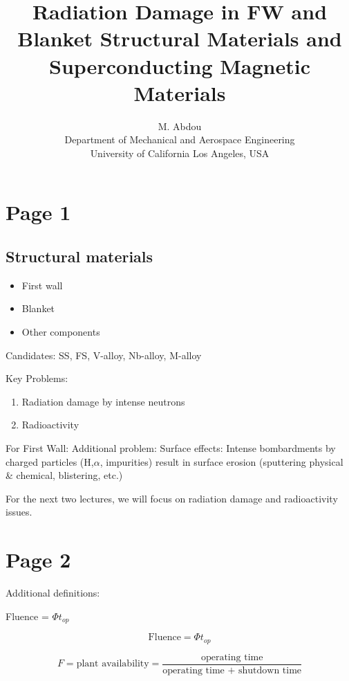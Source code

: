 \documentclass[11pt]{article}
\begin{document}
\doublespacing
\title{Radiation Damage in FW and Blanket Structural Materials and Superconducting Magnetic Materials}
\author{M. Abdou \\
Department of Mechanical and Aerospace Engineering \\
University of California Los Angeles, USA\\
}
\maketitle

\section{Page 1}
\subsection{Structural materials}
\begin{itemize}
\item First wall
\item Blanket
\item Other components
\end{itemize}
Candidates: SS, FS, V-alloy, Nb-alloy, M-alloy

Key Problems:
\begin{enumerate}
\item Radiation damage by intense neutrons
\item Radioactivity
\end{enumerate}

For First Wall:
Additional problem:
Surface effects: Intense bombardments by charged particles (H,$\alpha$, impurities) result in surface erosion (sputtering physical \& chemical, blistering, etc.)

For the next two lectures, we will focus on radiation damage and radioactivity issues.

\section{Page 2}
Additional definitions:

Fluence = $\Phi t_{op}$

\begin{equation}
	\text{Fluence} = \Phi t_{op}
\end{equation}

\begin{equation}
	F = \text{plant availability} = \frac{\text{operating time}}{\text{operating time + shutdown time}}
\end{equation}
\end{document}
